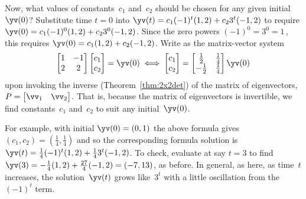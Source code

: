 \begin{example}
\begin{solution}
Now, what values of constants~\(c_1\) and~\(c_2\) should be chosen for any given initial~\(\yv(0)\)?
Substitute time \(t=0\) into \(\yv(t)=c_1(-1)^t(1,2)+c_23^t(-1,2)\) to require \(\yv(0)=c_1(-1)^0(1,2)+c_23^0(-1,2)\).
Since the zero powers \((-1)^0=3^0=1\)\,, this requires \(\yv(0)=c_1(1,2)+c_2(-1,2)\).
Write as the matrix-vector system
\begin{equation*}
\begin{bmatrix} 1&-1\\2&2 \end{bmatrix}
\begin{bmatrix} c_1\\c_2 \end{bmatrix}
=\yv(0)
\iff
\begin{bmatrix} c_1\\c_2 \end{bmatrix}
=\begin{bmatrix} \frac12&\frac14\\-\frac12&\frac14 \end{bmatrix}\yv(0)
\end{equation*}
upon invoking the inverse (Theorem~\ref{thm:2x2det}) of the matrix of eigenvectors, \(P=\begin{bmatrix} \vv_1&\vv_2 \end{bmatrix}\).
That is, because the matrix of eigenvectors is invertible, we find constants~\(c_1\) and~\(c_2\) to suit any initial~\(\yv(0)\).

For example, with initial \(\yv(0)=(0,1)\) the above formula gives \((c_1,c_2)=(\frac14,\frac14)\) and so the corresponding formula solution is \(\yv(t)=\frac14(-1)^t(1,2)+\frac143^t(-1,2)\).
To check, evaluate at say \(t=3\) to find 
\(\yv(3)=-\frac14(1,2)+\frac{27}4(-1,2)=(-7,13)\),
as before.
In general, as here, as time~\(t\) increases, the solution~\(\yv(t)\) grows like~\(3^t\) with a little oscillation from the~\((-1)^t\) term.
\end{solution}
\end{example}


